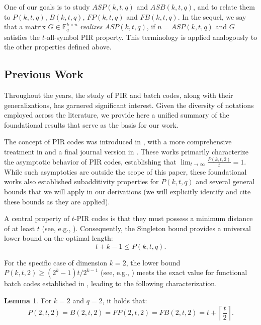 \documentclass[11pt,a4paper]{article}
\theoremstyle{definition}
\newtheorem{lemma}[theorem]{Lemma}
\newcommand{\F}{\mathbb{F}}
\begin{document}
One of our goals is to study $ASP(k,t,q)$ and $ASB(k,t,q)$, and to relate them to $P(k,t,q)$, $B(k,t,q)$, $FP(k,t,q)$ and $FB(k,t,q)$. In the sequel, we say that a matrix $G \in \F_q^{k \times n}$ \emph{realizes} $ASP(k,t,q)$, if $n=ASP(k,t,q)$ and $G$ satisfies the $t$-all-symbol PIR property. This terminology 
is applied analogously to the other properties defined above.

\subsection{Previous Work}\label{Sec:RelatedWork}
Throughout the years, the study of PIR and batch codes, along with their 
generalizations, has garnered significant interest. Given the diversity of notations 
employed across the literature, we provide here a 
unified summary of the foundational results that serve 
as the basis for our work.

The concept of PIR codes was introduced in 
\cite{fazeli2015codes}, with a more comprehensive 
treatment in \cite{FAZELI2015} and a final journal 
version in \cite{vardy2023private}. These works 
primarily characterize the asymptotic behavior of 
PIR codes, establishing that $\lim_{t \to \infty} 
\frac{P(k,t,2)}{t} = 1$. While such asymptotics 
are outside the scope of this paper, these foundational 
works also established subadditivity 
properties for $P(k,t,q)$ and several general bounds 
that we will apply in our derivations (we will explicitly identify and cite 
these bounds as they are applied).

A central property of $t$-PIR codes is that they must 
possess a minimum distance of at least $t$ (see, e.g., 
\cite{Skachek2018}). Consequently, the Singleton 
bound provides a universal lower bound on the 
optimal length:
\begin{equation}
    t + k - 1 \leq P(k,t,q). \label{eq:min_dis_atleast_t}
\end{equation}

For the specific case of dimension $k=2$, the lower 
bound $P(k,t,2) \geq {(2^k-1)t}/{2^{k-1}}$
(see, e.g., \cite[Theorem 9]{vardy2023private}) meets the exact value 
for functional batch codes established in 
\cite[Corollary 3.5]{KILIC2025}, leading to the 
following characterization.

\begin{lemma}\label{lem:k=2,q=2}
    For $k=2$ and $q=2$, it holds that:
    \[
    P(2,t,2) = B(2,t,2) = FP(2,t,2) = FB(2,t,2) 
    = t + \left\lceil \frac{t}{2}\right\rceil.
    \]
\end{lemma}
\end{document}
